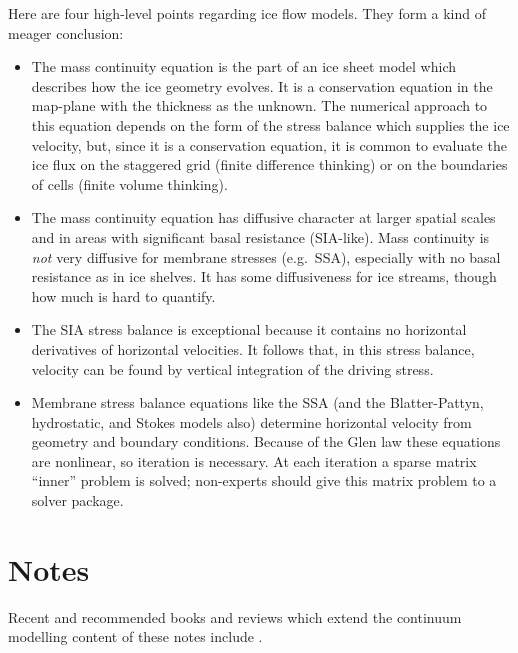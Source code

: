 \documentclass[letterpaper,final,12pt,reqno]{amsart}
\begin{document}
Here are four high-level points regarding ice flow models.  They form a kind of meager conclusion:
\begin{itemize}
\item The mass continuity equation is the part of an ice sheet model which describes how the ice geometry evolves.  It is a conservation equation in the map-plane with the thickness as the unknown.   The numerical approach to this equation depends on the form of the stress balance which supplies the ice velocity, but, since it is a conservation equation, it is common to evaluate the ice flux on the staggered grid (finite difference thinking) or on the boundaries of cells (finite volume thinking).
\item The mass continuity equation has diffusive character at larger spatial scales and in areas with significant basal resistance (SIA-like).  Mass continuity is \emph{not} very diffusive for membrane stresses (e.g.~SSA), especially with no basal resistance as in ice shelves.  It has some diffusiveness for ice streams, though how much is hard to quantify.
\item The SIA stress balance is exceptional because it contains no horizontal derivatives of horizontal velocities.  It follows that, in this stress balance, velocity can be found by vertical integration of the driving stress.
\item Membrane stress balance equations like the SSA (and the Blatter-Pattyn, hydrostatic, and Stokes models also) determine horizontal velocity from geometry and boundary conditions.  Because of the Glen law these equations are nonlinear, so iteration is necessary.  At each iteration a sparse matrix ``inner'' problem is solved; non-experts should give this matrix problem to a solver package.
\end{itemize}


\section{Notes} \label{sec:nr}

Recent and recommended books and reviews which extend the continuum modelling content of these notes include \cite{CuffeyPaterson,GreveBlatter2009,SchoofHewitt2013,vanderVeen}.
\end{document}
